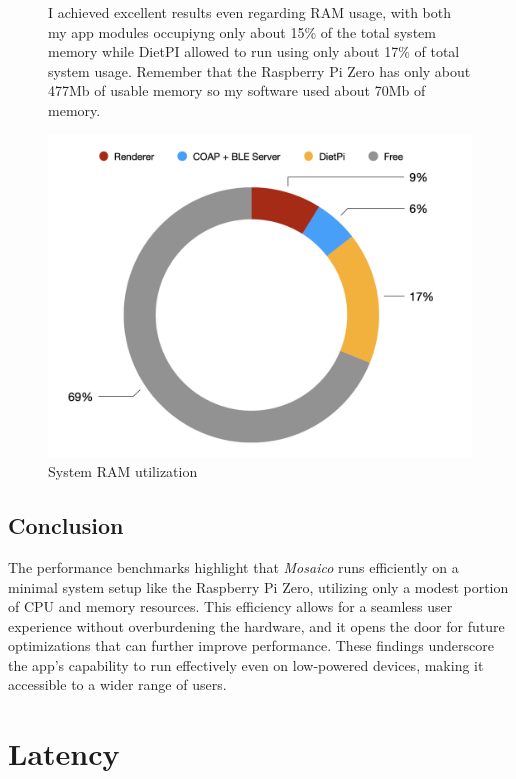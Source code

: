 \begin{figure}[H]
    \centering
    \begin{minipage}[b]{0.32\textwidth}
        I achieved excellent results even regarding RAM usage, with both my app modules occupiyng only about 15\% of the total system memory while DietPI allowed to run using only about 17\% of total system usage. Remember that the Raspberry Pi Zero has only about 477Mb of usable memory so my software used about 70Mb of memory.
    \end{minipage}
    \begin{minipage}[b]{0.65\textwidth}
        \centering
        \includegraphics[width=\textwidth]{tesi/img/benchmarks/RAM.png}
        \caption*{System RAM utilization}
    \end{minipage}
\end{figure}

\subsection{Conclusion}

The performance benchmarks highlight that \textit{Mosaico} runs efficiently on a minimal system setup like the Raspberry Pi Zero, utilizing only a modest portion of CPU and memory resources. This efficiency allows for a seamless user experience without overburdening the hardware, and it opens the door for future optimizations that can further improve performance. These findings underscore the app's capability to run effectively even on low-powered devices, making it accessible to a wider range of users.
\newpage
\section{Latency}
